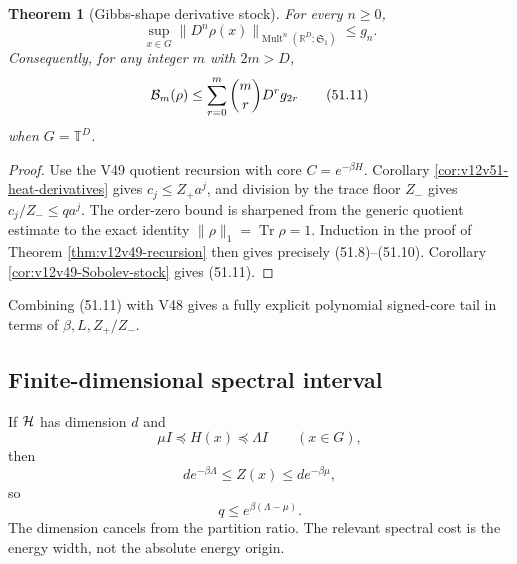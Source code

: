 \documentclass[11pt]{article}
\newtheorem{theorem}{Theorem}[section]
\theoremstyle{remark}
\begin{document}
\begin{theorem}[Gibbs-shape derivative stock]
\label{thm:v12v51-Gibbs-stock}
For every \(n\geq0\),
\begin{equation}
 \sup_{x\in G}
 \|D^n\rho(x)\|_{\operatorname{Mult}^n
  (\mathbb R^D;{\mathfrak S}_1)}
 \leq g_n.                                       \tag{51.10}
\end{equation}
Consequently, for any integer \(m\) with \(2m>D\),
\begin{equation}
 {\cal B}_m(\rho)
 \leq
 \sum_{r=0}^m\binom mrD^rg_{2r}                 \tag{51.11}
\end{equation}
when \(G={\mathbb T}^D\).
\end{theorem}

\begin{proof}
Use the V49 quotient recursion with core
\(C=e^{-\beta H}\).  Corollary
\ref{cor:v12v51-heat-derivatives} gives
\(c_j\leq Z_+a^j\), and division by the trace floor \(Z_-\) gives
\(c_j/Z_-\leq qa^j\).  The order-zero bound is sharpened from the
generic quotient estimate to the exact identity
\(\|\rho\|_1=\operatorname{Tr}\rho=1\).  Induction in the proof of
Theorem \ref{thm:v12v49-recursion} then gives precisely
(51.8)--(51.10).  Corollary
\ref{cor:v12v49-Sobolev-stock} gives (51.11).
\end{proof}

Combining (51.11) with V48 gives a fully explicit polynomial
signed-core tail in terms of \(\beta,L,Z_+/Z_-\).

\subsection{Finite-dimensional spectral interval}

If \({\cal H}\) has dimension \(d\) and
\begin{equation}
 \mu I\preceq H(x)\preceq\Lambda I
 \qquad(x\in G),                                  \tag{51.12}
\end{equation}
then
\begin{equation}
 d e^{-\beta\Lambda}
 \leq Z(x)\leq
 d e^{-\beta\mu},                                 \tag{51.13}
\end{equation}
so
\begin{equation}
                         q\leq e^{\beta(\Lambda-\mu)}.      \tag{51.14}
\end{equation}
The dimension cancels from the partition ratio.  The relevant
spectral cost is the energy width, not the absolute energy origin.
\end{document}
